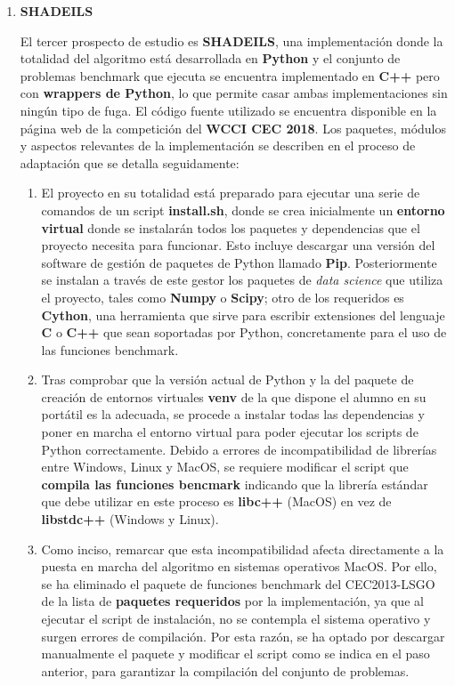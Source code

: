 \begin{enumerate}
	\item \textbf{SHADEILS}
	
	El tercer prospecto de estudio es \textbf{SHADEILS}\cite{SHADEILS,SHADEILS-Conf}, una implementación  donde la totalidad del algoritmo está desarrollada en \textbf{Python} y el conjunto de problemas benchmark que ejecuta se encuentra implementado en \textbf{C++} pero con \textbf{wrappers de Python}, lo que permite casar ambas implementaciones sin ningún tipo de fuga. El código fuente utilizado se encuentra disponible en la página web de la competición del \textbf{WCCI CEC 2018}\cite{WCCI-SHADEILS}. Los paquetes, módulos y aspectos relevantes de la implementación se describen en el proceso de adaptación que se detalla seguidamente:
	
	\begin{enumerate}
		\item El proyecto en su totalidad está preparado para ejecutar una serie de comandos de un script \textbf{install.sh}, donde se crea inicialmente un \textbf{entorno virtual} donde se instalarán todos los paquetes y dependencias que el proyecto necesita para funcionar. Esto incluye descargar una versión del software de gestión de paquetes de Python llamado \textbf{Pip}\cite{PyIP}. Posteriormente se instalan a través de este gestor los paquetes de \textit{data science} que utiliza el proyecto, tales como \textbf{Numpy} o \textbf{Scipy}; otro de los requeridos es \textbf{Cython}\cite{Cython}, una herramienta que sirve para escribir extensiones del lenguaje \textbf{C} o \textbf{C++} que sean soportadas por Python, concretamente para el uso de las funciones benchmark.
		
		\item Tras comprobar que la versión actual de Python y la del paquete de creación de entornos virtuales \textbf{venv} de la que dispone el alumno en su portátil es la adecuada, se procede a instalar todas las dependencias y poner en marcha el entorno virtual para poder ejecutar los scripts de Python correctamente. Debido a errores de incompatibilidad de librerías entre Windows, Linux y MacOS, se requiere modificar el script que \textbf{compila las funciones bencmark} indicando que la librería estándar que debe utilizar en este proceso es \textbf{libc++} (MacOS) en vez de \textbf{libstdc++} (Windows y Linux).
		
		\item Como inciso, remarcar que esta incompatibilidad afecta directamente a la puesta en marcha del algoritmo en sistemas operativos MacOS. Por ello, se ha eliminado el paquete de funciones benchmark del CEC2013-LSGO de la lista de \textbf{paquetes requeridos} por la implementación, ya que al ejecutar el script de instalación, no se contempla el sistema operativo y surgen errores de compilación. Por esta razón, se ha optado por descargar manualmente el paquete y modificar el script como se indica en el paso anterior, para garantizar la compilación del conjunto de problemas.
		

\end{enumerate}
\end{enumerate}
